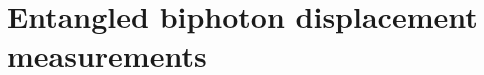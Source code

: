 \chapter[Biphoton displacement measurements]{Entangled biphoton displacement measurements}\label{ch:biphotons}


